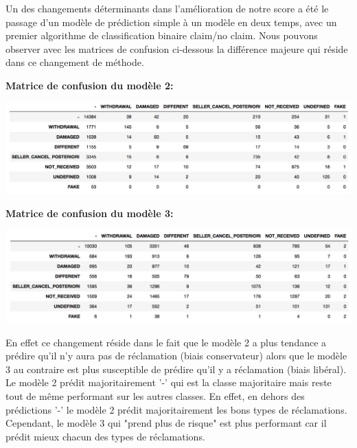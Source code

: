 Un des changements déterminants dans l'amélioration de notre score a été le passage d'un
modèle de prédiction simple à un modèle en deux temps, avec un premier algorithme
de classification binaire claim/no claim. Nous pouvons observer avec les matrices de confusion
ci-dessous la différence majeure qui réside dans ce changement de méthode.

\vspace{4.5cm}
\textbf{Matrice de confusion du modèle 2:}
\vspace{0.5cm}
\begin{center}
\includegraphics[scale=0.5]{assets/confmat1} 
\end{center}
\vspace{1.5cm}

\textbf{Matrice de confusion du modèle 3:}
\vspace{0.5cm}
\begin{center}
\includegraphics[scale=0.5]{assets/confmat2} 
\end{center}
\vspace{0.5cm}

En effet ce changement réside dans le fait que le modèle 2 a plus tendance a prédire qu'il
n'y aura pas de réclamation (biais conservateur) alors que le modèle 3 au contraire est plus 
susceptible de prédire qu'il y a réclamation (biais libéral). Le modèle 2 prédit 
majoritairement '-' qui est la classe majoritaire mais reste tout de même performant
sur les autres classes. En effet, en dehors des prédictions '-' le modèle 2 prédit 
majoritairement les bons types de réclamations. Cependant, le modèle 3 qui "prend plus de 
risque" est plus performant car il prédit mieux chacun des types de réclamations.

